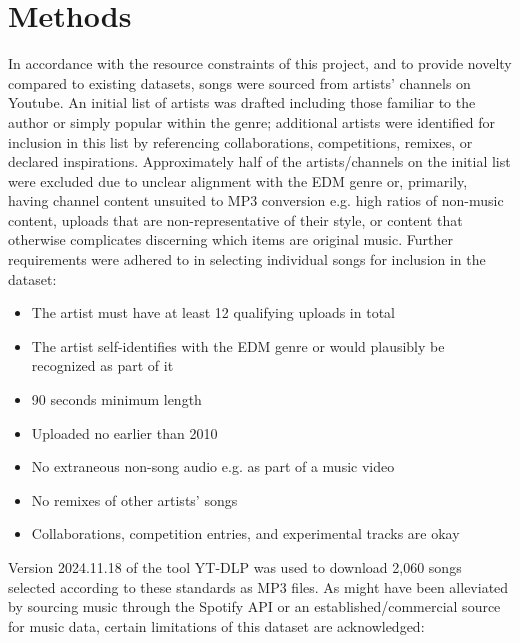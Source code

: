 \documentclass[article,pdftex,12pt,a4paper]{article}
\begin{document}
\section{Methods}
In accordance with the resource constraints of this project, and to provide novelty compared to existing datasets, songs were sourced from artists' channels on Youtube. An initial list of artists was drafted including those familiar to the author or simply popular within the genre; additional artists were identified for inclusion in this list by referencing collaborations, competitions, remixes, or declared inspirations. Approximately half of the artists/channels on the initial list were excluded due to unclear alignment with the EDM genre or, primarily, having channel content unsuited to MP3 conversion e.g. high ratios of non-music content, uploads that are non-representative of their style, or content that otherwise complicates discerning which items are original music. Further requirements were adhered to in selecting individual songs for inclusion in the dataset:
\begin{itemize}
  \item The artist must have at least 12 qualifying uploads in total
  \item The artist self-identifies with the EDM genre or would plausibly be recognized as part of it
  \item 90 seconds minimum length
  \item Uploaded no earlier than 2010
  \item No extraneous non-song audio e.g. as part of a music video
  \item No remixes of other artists' songs
  \item Collaborations, competition entries, and experimental tracks are okay
\end{itemize}
Version 2024.11.18 of the tool YT-DLP was used to download 2,060 songs selected according to these standards as MP3 files. As might have been alleviated by sourcing music through the Spotify API or an established/commercial source for music data, certain limitations of this dataset are acknowledged:
\end{document}
